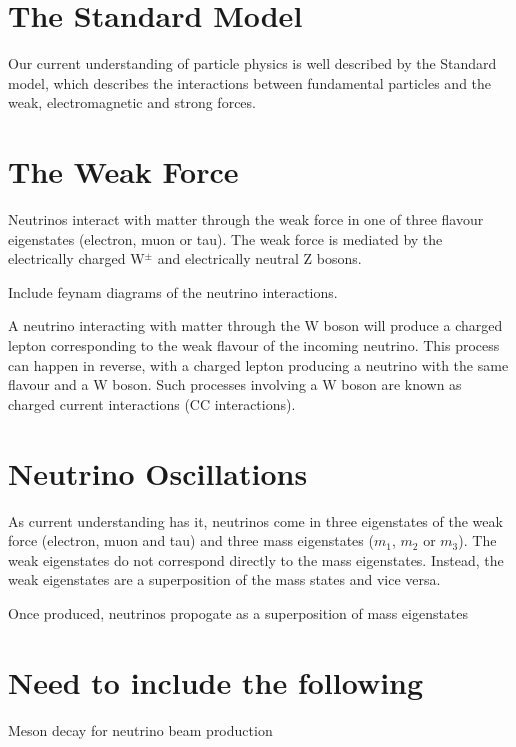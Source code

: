 
\section{The Standard Model}

Our current understanding of particle physics is well described by the Standard model, which describes the interactions between fundamental particles and the weak, electromagnetic and strong forces.



\section{The Weak Force}

Neutrinos interact with matter through the weak force in one of three flavour eigenstates (electron, muon or tau). The weak force is mediated by the electrically charged W$^{\pm}$ and electrically neutral Z bosons.

Include feynam diagrams of the neutrino interactions.

A neutrino interacting with matter through the W boson will produce a charged lepton corresponding to the weak flavour of the incoming neutrino. 
This process can happen in reverse, with a charged lepton producing a neutrino with the same flavour and a W boson. Such processes involving a W boson are known as charged current interactions (CC interactions).


\section{Neutrino Oscillations}

As current understanding has it, neutrinos come in three eigenstates of the weak force (electron, muon and tau) and three mass eigenstates ($m_1$, $m_2$ or $m_3$). 
The weak eigenstates do not correspond directly to the mass eigenstates. Instead, the weak eigenstates are a superposition of the mass states and vice versa. 

Once produced, neutrinos propogate as a superposition of mass eigenstates 


\section{Need to include the following}
Meson decay for neutrino beam production